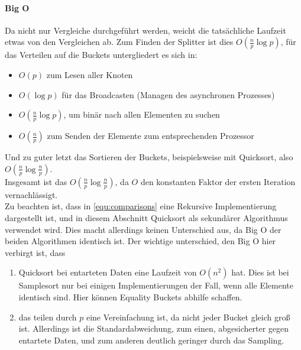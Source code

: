 		\paragraph{Big O}
			Da nicht nur Vergleiche durchgeführt werden, weicht die tatsächliche Laufzeit etwas von den Vergleichen ab.
			Zum Finden der Splitter ist dies $O\left(\frac{n}{p}\log{p}\right)$, für das Verteilen auf die Buckets untergliedert es sich in: \autocite{wikipedia-contributors-2021}
			\begin{itemize}
				\item $O(p)$ zum Lesen aller Knoten
				\item $O(\log{p})$ für das Broadcasten (Managen des asynchronen Prozesses)
				\item $O\left(\frac{n}{p}\log{p}\right)$, um binär nach allen Elementen zu suchen
				\item $O\left(\frac{n}{p}\right)$ zum Senden der Elemente zum entsprechenden Prozessor
			\end{itemize}
			Und zu guter letzt das Sortieren der Buckets, beispielsweise mit Quicksort, also $O\left(\frac{n}{p}\log{\frac{n}{p}}\right)$.\\
			Insgesamt ist das $O\left(\frac{n}{p}\log{\frac{n}{p}}\right)$, da $O$ den konstanten Faktor der ersten Iteration vernachlässigt.\\
			Zu beachten ist, dass in \ref{equ:comparisons} eine Rekursive Implementierung dargestellt ist, und in diesem Abschnitt Quicksort als sekundärer Algorithmus verwendet wird.
			Dies macht allerdings keinen Unterschied aus, da Big O der beiden Algorithmen identisch ist.
			Der wichtige unterschied, den Big O hier verbirgt ist, dass
			\begin{enumerate}
				\item Quicksort bei entarteten Daten eine Laufzeit von $O\left(n^2\right)$ hat.
					Dies ist bei Samplesort nur bei einigen Implementierungen der Fall, wenn alle Elemente identisch sind.
					Hier können Equality Buckets abhilfe schaffen.
				\item das teilen durch $p$ eine Vereinfachung ist, da nicht jeder Bucket gleich groß ist.
					Allerdings ist die Standardabweichung, zum einen, abgesicherter gegen entartete Daten, und zum anderen deutlich geringer durch das Sampling.
			\end{enumerate}
			
